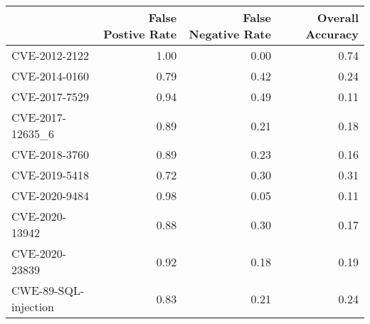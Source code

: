 \begin{tabular}{lrrr}
\toprule
{} &  False Postive Rate &  False Negative Rate &  Overall Accuracy \\
\midrule
CVE-2012-2122        &                1.00 &                 0.00 &              0.74 \\
CVE-2014-0160        &                0.79 &                 0.42 &              0.24 \\
CVE-2017-7529        &                0.94 &                 0.49 &              0.11 \\
CVE-2017-12635\_6     &                0.89 &                 0.21 &              0.18 \\
CVE-2018-3760        &                0.89 &                 0.23 &              0.16 \\
CVE-2019-5418        &                0.72 &                 0.30 &              0.31 \\
CVE-2020-9484        &                0.98 &                 0.05 &              0.11 \\
CVE-2020-13942       &                0.88 &                 0.30 &              0.17 \\
CVE-2020-23839       &                0.92 &                 0.18 &              0.19 \\
CWE-89-SQL-injection &                0.83 &                 0.21 &              0.24 \\
\bottomrule
\end{tabular}
